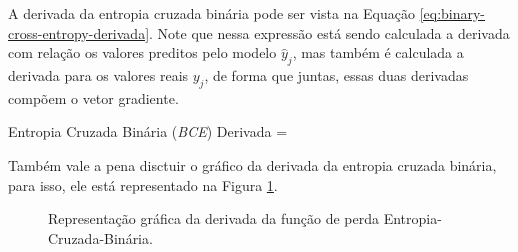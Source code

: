 A derivada da entropia cruzada binária pode ser vista na Equação \ref{eq:binary-cross-entropy-derivada}. Note que nessa expressão está sendo calculada a derivada com relação os valores preditos pelo modelo $\hat{y}_j$, mas também é calculada a derivada para os valores reais $y_j$, de forma que juntas, essas duas derivadas compõem o vetor gradiente.

\begin{equacaodestaque}{Entropia Cruzada Binária (\textit{BCE}) Derivada}
     = 
    \label{eq:binary-cross-entropy-derivada}
\end{equacaodestaque}

Também vale a pena disctuir o gráfico da derivada da entropia cruzada binária, para isso, ele está representado na Figura \ref{fig:binary-cross-entropy-derivada}.

\begin{figure}[h!]
    \centering
    \caption{Representação gráfica da derivada da função de perda Entropia-Cruzada-Binária.}
    \label{fig:binary-cross-entropy-derivada}
\end{figure}

